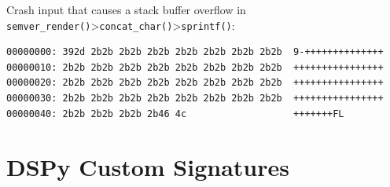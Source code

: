 \documentclass[
  a4paper,
]{scrreprt}
\theoremstyle{definition}
\theoremstyle{remark}
\begin{document}
Crash input that causes a stack buffer overflow in
\texttt{semver\_render()}\textgreater{}\texttt{concat\_char()}\textgreater{}\texttt{sprintf()}:

\begin{verbatim}
00000000: 392d 2b2b 2b2b 2b2b 2b2b 2b2b 2b2b 2b2b  9-++++++++++++++
00000010: 2b2b 2b2b 2b2b 2b2b 2b2b 2b2b 2b2b 2b2b  ++++++++++++++++
00000020: 2b2b 2b2b 2b2b 2b2b 2b2b 2b2b 2b2b 2b2b  ++++++++++++++++
00000030: 2b2b 2b2b 2b2b 2b2b 2b2b 2b2b 2b2b 2b2b  ++++++++++++++++
00000040: 2b2b 2b2b 2b2b 2b46 4c                   +++++++FL
\end{verbatim}

\chapter{DSPy Custom Signatures}\label{sec-signatures}
\end{document}
